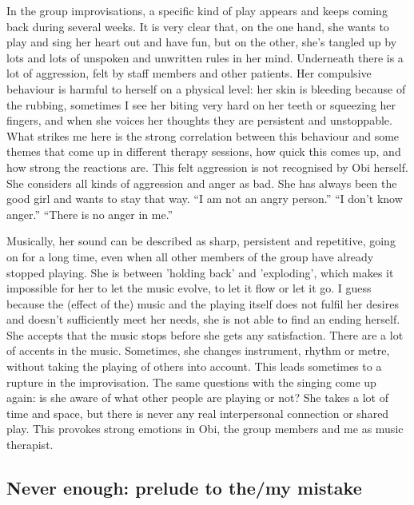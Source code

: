 \documentclass[authordate, empirical]{jote-new-article}
\begin{document}
In the group improvisations, a specific kind of play appears and keeps coming back during several weeks. It is very clear that, on the one hand, she wants to play and sing her heart out and have fun, but on the other, she's tangled up by lots and lots of unspoken and unwritten rules in her mind. Underneath there is a lot of aggression, felt by staff members and other patients. Her compulsive behaviour is harmful to herself on a physical level: her skin is bleeding because of the rubbing, sometimes I see her biting very hard on her teeth or squeezing her fingers, and when she voices her thoughts they are persistent and unstoppable. What strikes me here is the strong correlation between this behaviour and some themes that come up in different therapy sessions, how quick this comes up, and how strong the reactions are. This felt aggression is not recognised by Obi herself. She considers all kinds of aggression and anger as bad. She has always been the good girl and wants to stay that way. “I am not an angry person.” “I don't know anger.” “There is no anger in me.”



Musically, her sound can be described as sharp, persistent and repetitive, going on for a long time, even when all other members of the group have already stopped playing. She is between 'holding back' and 'exploding', which makes it impossible for her to let the music evolve, to let it flow or let it go. I guess because the (effect of the) music and the playing itself does not fulfil her desires and doesn't sufficiently meet her needs, she is not able to find an ending herself. She accepts that the music stops before she gets any satisfaction. There are a lot of accents in the music. Sometimes, she changes instrument, rhythm or metre, without taking the playing of others into account. This leads sometimes to a rupture in the improvisation. The same questions with the singing come up again: is she aware of what other people are playing or not? She takes a lot of time and space, but there is never any real interpersonal connection or shared play. This provokes strong emotions in Obi, the group members and me as music therapist.







\subsection{Never enough: prelude to the/my mistake}
\end{document}
